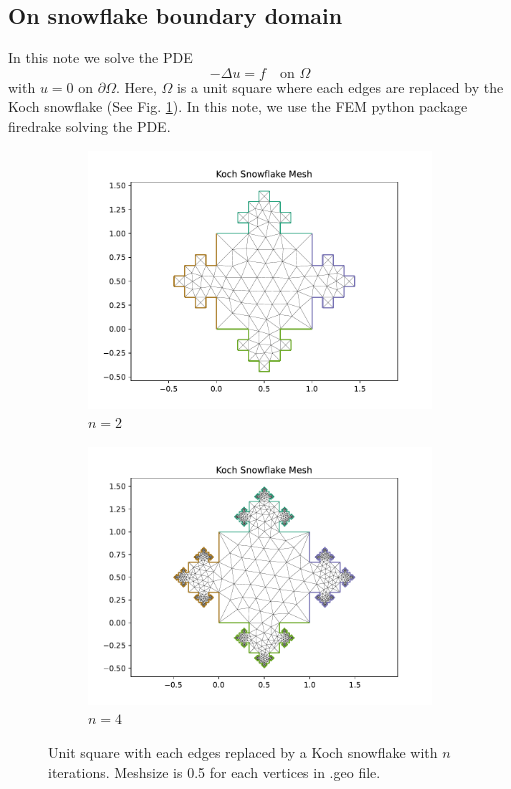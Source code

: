 \documentclass[12pt]{article}%
\theoremstyle{plain}
\numberwithin{equation}{section}
\begin{document}
\subsection{On snowflake boundary domain}
In this note we solve the PDE 
\begin{equation}
-\Delta u =f \quad\text{on }\Omega
\label{eqn:Ex3}
\end{equation}
with $u=0$ on $\partial \Omega$. Here, $\Omega$ is a unit square where each edges are replaced by the Koch snowflake (See Fig. \ref{fig:snow_2d_Dirichlet}). In this note, we use the FEM python package firedrake solving the PDE. 

  \begin{figure}[H]%
    \centering
         \begin{subfigure}[h]{0.45\linewidth}
         \caption{$n=2$}
\includegraphics[width=\linewidth]{figures/Ex3/Ex3_snow_square_2.pdf}
\end{subfigure}
 \begin{subfigure}[h]{0.45\linewidth}
 \caption{$n=4$}
\includegraphics[width=\linewidth]{figures/Ex3/Ex3_snow_square_4.pdf}
\end{subfigure}
  \caption{Unit square with each edges replaced by a Koch snowflake with $n$ iterations. Meshsize is 0.5 for each vertices in .geo file.}
  \label{fig:snow_2d_Dirichlet}
 \end{figure}
\end{document}
